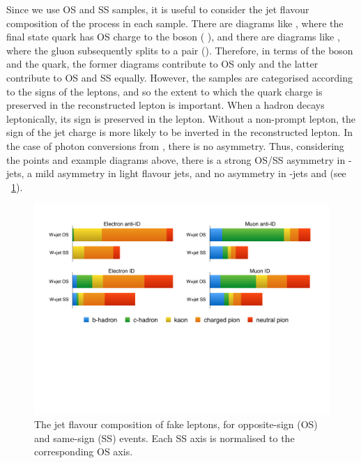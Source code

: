 Since we use OS and SS samples, it is useful to consider the jet flavour composition of 
the \Wjets process in each sample. There are diagrams like , where the final state quark has OS charge to the \PW boson (\eg 
\HepProcess{\PW + \Pcharm}), and there are diagrams like , where the gluon subsequently splits to a \HepProcess{\Pquark\APquark} 
pair (\eg \HepProcess{\PW + \Pbottom\APbottom}). Therefore, in terms of the \PW boson and 
the quark, the former diagrams contribute to OS only and the latter contribute to OS and 
SS equally. However, the samples are categorised according to the signs of the leptons, 
and so the extent to which the quark charge is preserved in the reconstructed lepton is 
important. When a hadron decays leptonically, its sign is preserved in the lepton. 
Without a non-prompt lepton, the sign of the jet charge is more likely to be inverted in 
the reconstructed lepton. In the case of photon conversions from \HepProcess{\Ppizero 
\HepTo \Pphoton\Pphoton}, there is no asymmetry. Thus, considering the points and example 
diagrams above, there is a strong OS/SS asymmetry in \Pcharm-jets, a mild asymmetry in 
light flavour jets, and no asymmetry in \Pbottom-jets and \HepProcess{\Ppizero \HepTo 
\Pphoton\Pphoton} (see \Figure~\ref{fig:wjets:flav_comp}).

\begin{figure}[t]
	\includegraphics[width=\hugefigwidth,clip=true,trim=1.8cm 12cm 2cm 2cm]{custom_images/wjets/wjets_flavcomp}
	\caption{The jet flavour composition of fake leptons, for opposite-sign (OS) and 
	same-sign (SS) \Wjets events. Each SS axis is normalised to the corresponding OS 
	axis.}
	\label{fig:wjets:flav_comp}
\end{figure}

